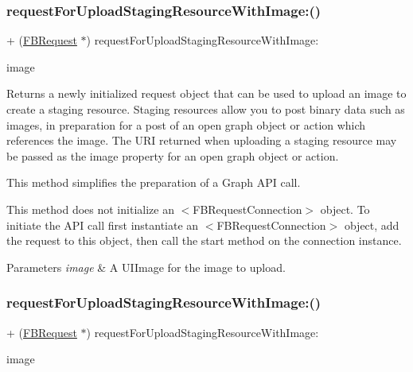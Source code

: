 \subsubsection{\texorpdfstring{request\+For\+Upload\+Staging\+Resource\+With\+Image\+:()}{requestForUploadStagingResourceWithImage:()}\hspace{0.1cm}{\footnotesize\ttfamily [4/5]}}
{\footnotesize\ttfamily + (\hyperlink{interfaceFBRequest}{F\+B\+Request} $\ast$) request\+For\+Upload\+Staging\+Resource\+With\+Image\+: \begin{DoxyParamCaption}\item[{(U\+I\+Image $\ast$)}]{image }\end{DoxyParamCaption}}

Returns a newly initialized request object that can be used to upload an image to create a staging resource. Staging resources allow you to post binary data such as images, in preparation for a post of an open graph object or action which references the image. The U\+RI returned when uploading a staging resource may be passed as the image property for an open graph object or action.

This method simplifies the preparation of a Graph A\+PI call.

This method does not initialize an $<$\+F\+B\+Request\+Connection$>$ object. To initiate the A\+PI call first instantiate an $<$\+F\+B\+Request\+Connection$>$ object, add the request to this object, then call the {\ttfamily start} method on the connection instance.


\begin{DoxyParams}{Parameters}
{\em image} & A {\ttfamily U\+I\+Image} for the image to upload. \\
\hline
\end{DoxyParams}
\mbox{\label{interfaceFBRequest_a4a85038bef70a9edd91a56ab0db0bfd6}} 
\subsubsection{\texorpdfstring{request\+For\+Upload\+Staging\+Resource\+With\+Image\+:()}{requestForUploadStagingResourceWithImage:()}\hspace{0.1cm}{\footnotesize\ttfamily [5/5]}}
{\footnotesize\ttfamily + (\hyperlink{interfaceFBRequest}{F\+B\+Request} $\ast$) request\+For\+Upload\+Staging\+Resource\+With\+Image\+: \begin{DoxyParamCaption}\item[{(U\+I\+Image $\ast$)}]{image }\end{DoxyParamCaption}}

